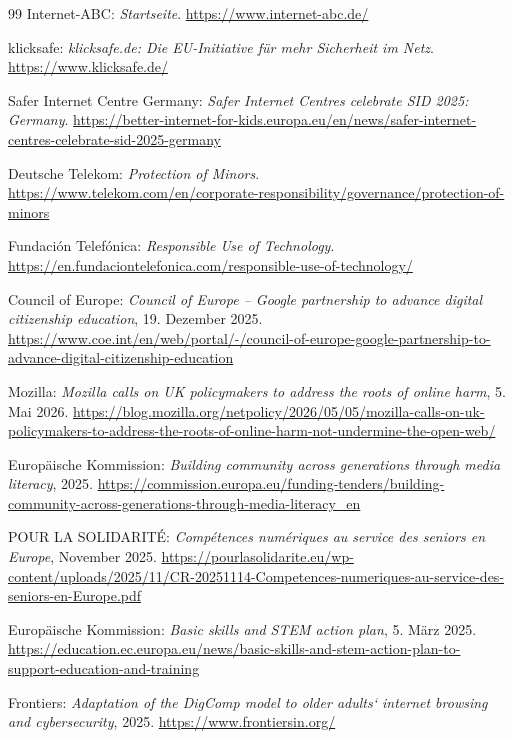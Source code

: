 \documentclass[11pt,a4paper]{article}
\begin{document}
\begin{thebibliography}{99}
		 Internet-ABC: \textit{Startseite}. \url{https://www.internet-abc.de/}
		
		 klicksafe: \textit{klicksafe.de: Die EU-Initiative für mehr Sicherheit im Netz}. \url{https://www.klicksafe.de/}
		
		 Safer Internet Centre Germany: \textit{Safer Internet Centres celebrate SID 2025: Germany}. \url{https://better-internet-for-kids.europa.eu/en/news/safer-internet-centres-celebrate-sid-2025-germany}
		
		 Deutsche Telekom: \textit{Protection of Minors}. \url{https://www.telekom.com/en/corporate-responsibility/governance/protection-of-minors}
		
		 Fundación Telefónica: \textit{Responsible Use of Technology}. \url{https://en.fundaciontelefonica.com/responsible-use-of-technology/}
		
		 Council of Europe: \textit{Council of Europe -- Google partnership to advance digital citizenship education}, 19. Dezember 2025. \url{https://www.coe.int/en/web/portal/-/council-of-europe-google-partnership-to-advance-digital-citizenship-education}
		
		 Mozilla: \textit{Mozilla calls on UK policymakers to address the roots of online harm}, 5. Mai 2026. \url{https://blog.mozilla.org/netpolicy/2026/05/05/mozilla-calls-on-uk-policymakers-to-address-the-roots-of-online-harm-not-undermine-the-open-web/}
		
		 Europäische Kommission: \textit{Building community across generations through media literacy}, 2025. \url{https://commission.europa.eu/funding-tenders/building-community-across-generations-through-media-literacy_en}
		
		 POUR LA SOLIDARITÉ: \textit{Compétences numériques au service des seniors en Europe}, November 2025. \url{https://pourlasolidarite.eu/wp-content/uploads/2025/11/CR-20251114-Competences-numeriques-au-service-des-seniors-en-Europe.pdf}
		
		 Europäische Kommission: \textit{Basic skills and STEM action plan}, 5. März 2025. \url{https://education.ec.europa.eu/news/basic-skills-and-stem-action-plan-to-support-education-and-training}
		
		 Frontiers: \textit{Adaptation of the DigComp model to older adults‘ internet browsing and cybersecurity}, 2025. \url{https://www.frontiersin.org/}
		

\end{thebibliography}
\end{document}
